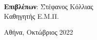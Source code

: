 \begin{titlepage}
\begin{center}
\begin{flushleft}
\begin{tabbing}
            \textbf{Επιβλέπων}: \= Στέφανος Κόλλιας \\
                                \> Καθηγητής Ε.Μ.Π.
        \end{tabbing}
        \end{flushleft}

            
        \vspace{2.5cm}
            

        

        Αθήνα, Οκτώβριος 2022
            
    \end{center}
\end{titlepage}
